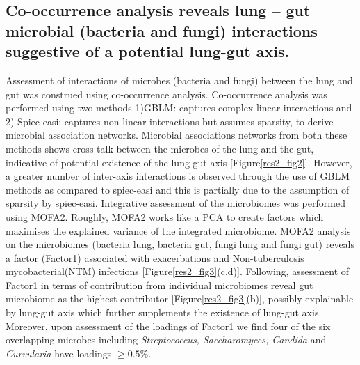 \subsection{Co-occurrence analysis reveals lung – gut microbial (bacteria and fungi) interactions suggestive of a potential lung-gut axis.}
Assessment of interactions of microbes (bacteria and fungi) between the lung and gut was construed using co-occurrence analysis. Co-occurrence analysis was performed using two methods 1)GBLM: captures complex linear interactions and 2) Spiec-easi: captures non-linear interactions but assumes sparsity, to derive microbial association networks. Microbial associations networks from both these methods shows cross-talk between the microbes of the lung and the gut, indicative of potential existence of the lung-gut axis [Figure\ref{res2_fig2}]. However, a greater number of inter-axis interactions is observed through the use of GBLM methods as compared to spiec-easi and this is partially due to the assumption of sparsity by spiec-easi. Integrative assessment of the microbiomes was performed using MOFA2. Roughly, MOFA2 works like a PCA to create factors which maximises the explained variance of the integrated microbiome. MOFA2 analysis on the microbiomes (bacteria lung, bacteria gut, fungi lung and fungi gut) reveals a factor (Factor1) associated with exacerbations and Non-tuberculosis mycobacterial(NTM) infections [Figure\ref{res2_fig3}(c,d)]. Following, assessment of Factor1 in terms of contribution from individual microbiomes reveal gut microbiome as the highest contributor [Figure\ref{res2_fig3}(b)], possibly explainable by lung-gut axis which further supplements the existence of lung-gut axis. Moreover, upon assessment of the loadings of Factor1 we find four of the six overlapping microbes including \emph{Streptococcus, Saccharomyces, Candida} and \emph{Curvularia} have loadings $\geq 0.5\%$.

